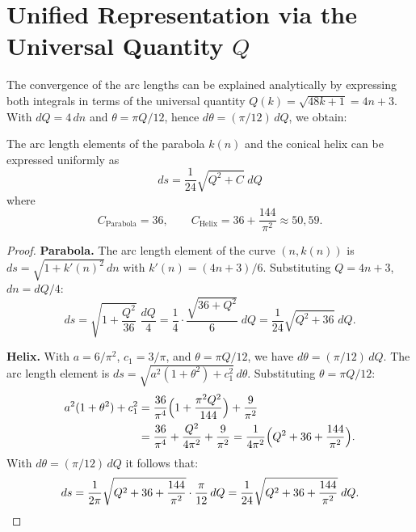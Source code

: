 \section{Unified Representation via the Universal Quantity \texorpdfstring{$Q$}{Q}}

The convergence of the arc lengths can be explained analytically by
expressing both integrals in terms of the universal quantity
$Q(k) = \sqrt{48k+1} = 4n+3$. With $dQ = 4\,dn$ and
$\theta = \pi Q/12$, hence $d\theta = (\pi/12)\,dQ$, we obtain:

\begin{theorem}\label{satz:q-bogenlaenge}
The arc length elements of the parabola $k(n)$ and the conical helix can be
expressed uniformly as
\begin{equation}\label{eq:ds-einheitlich}
  ds = \frac{1}{24}\sqrt{Q^2 + C}\; dQ
\end{equation}
where
\[
  C_{\mathrm{Parabola}} = 36,
  \qquad
  C_{\mathrm{Helix}} = 36 + \frac{144}{\pi^2} \approx 50{,}59.
\]
\end{theorem}

\begin{proof}
\textbf{Parabola.}\; The arc length element of the curve $(n, k(n))$ is
$ds = \sqrt{1 + k'(n)^2}\,dn$ with $k'(n) = (4n+3)/6$.
Substituting $Q = 4n+3$, $dn = dQ/4$:
\[
  ds = \sqrt{1 + \frac{Q^2}{36}}\;\frac{dQ}{4}
     = \frac{1}{4}\cdot\frac{\sqrt{36 + Q^2}}{6}\;dQ
     = \frac{1}{24}\sqrt{Q^2 + 36}\;dQ.
\]

\textbf{Helix.}\; With $a = 6/\pi^2$, $c_1 = 3/\pi$, and
$\theta = \pi Q/12$, we have $d\theta = (\pi/12)\,dQ$. The arc length element is
$ds = \sqrt{a^2(1+\theta^2) + c_1^2}\,d\theta$. Substituting
$\theta = \pi Q/12$:
\begin{align*}
  a^2(1+\theta^2) + c_1^2
  &= \frac{36}{\pi^4}\Bigl(1 + \frac{\pi^2 Q^2}{144}\Bigr) + \frac{9}{\pi^2}\\
  &= \frac{36}{\pi^4} + \frac{Q^2}{4\pi^2} + \frac{9}{\pi^2}
   = \frac{1}{4\pi^2}\Bigl(Q^2 + 36 + \frac{144}{\pi^2}\Bigr).
\end{align*}
With $d\theta = (\pi/12)\,dQ$ it follows that:
\[
  ds = \frac{1}{2\pi}\sqrt{Q^2 + 36 + \frac{144}{\pi^2}}
       \cdot \frac{\pi}{12}\,dQ
     = \frac{1}{24}\sqrt{Q^2 + 36 + \frac{144}{\pi^2}}\;dQ.
     \qedhere
\]
\end{proof}

